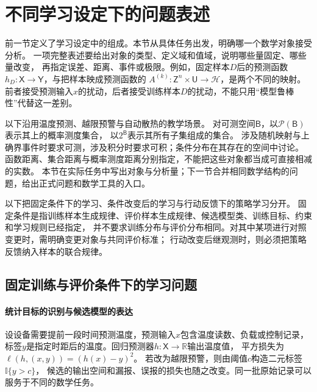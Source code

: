 \FloatBarrier
\section{不同学习设定下的问题表述}
\label{sec:future-learning-question-inventory}

前一节定义了学习设定中的组成。本节从具体任务出发，明确哪一个数学对象接受分析。
一项完整表述要给出对象的类型、定义域和值域，说明哪些量固定、哪些量改变，
再指定误差、距离、事件或极限。例如，固定样本$D$后的预测函数
$h_D:\mathsf X\to\mathsf Y$，与把样本映成预测函数的
$A^{(k)}:\mathsf Z^n\times\mathsf U\to\mathcal H$，是两个不同的映射。
前者接受预测输入$x$的扰动，后者接受训练样本$D$的扰动，不能只用“模型鲁棒性”代替这一差别。

以下沿用温度预测、越限预警与自动散热的教学场景。
对可测空间$\mathsf B$，以$\mathcal P(\mathsf B)$表示其上的概率测度集合，
以$2^{\mathsf B}$表示其所有子集组成的集合。
涉及随机映射与上确界事件时要求可测，涉及积分时要求可积；条件分布在其存在的空间中讨论。
函数距离、集合距离与概率测度距离分别指定，不能把这些对象都当成可直接相减的实数。
本节在实际任务中写出对象与分析量；下一节合并相同数学结构的问题，给出正式问题和数学工具的入口。

以下把固定条件下的学习、条件改变后的学习与行动反馈下的策略学习分开。
固定条件是指训练样本生成规律、评价样本生成规律、候选模型类、训练目标、约束和学习规则已经指定，
并不要求训练分布与评价分布相同。对其中某项进行对照变更时，需明确变更对象与共同评价标准；
行动改变后继观测时，则必须把策略反馈纳入样本的联合规律。

\subsection{固定训练与评价条件下的学习问题}
\label{sec:future-fixed-learning-conditions}

\paragraph{统计目标的识别与候选模型的表达}
\label{sec:future-ml-information-expression}

设设备需要提前一段时间预测温度，预测输入$x$包含温度读数、负载或控制记录，
标签$y$是指定时距后的温度。回归预测器$h:\mathsf X\to\mathbb R$输出温度值，
平方损失为$\ell(h,(x,y))=(h(x)-y)^2$。
若改为越限预警，则由阈值$c$构造二元标签$\mathbb I\{y>c\}$，
候选的输出空间和漏报、误报的损失也随之改变。同一批原始记录可以服务于不同的数学任务。

